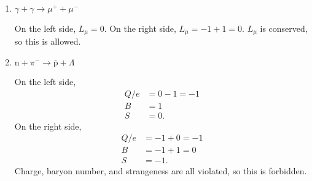 \documentclass[11pt]{article}
\begin{document}
\begin{enumerate}[label=\textbf{\arabic*.}]
{\begin{enumerate}[label=\textbf{(\alph*)}]
{\begin{enumerate}[label=\textbf{(\roman*)}]
{                            \begin{align*}
                                Q/e&=\frac{2}{3}-\frac{2}{3}=0 \\
                                B&=\frac{1}{3}-\frac{1}{3}=0 \\
                                S&=0.
                            \end{align*}
                            On the right side,
                            \begin{align*}
                                Q/e&=\frac{1}{3}-\frac{1}{3}=0 \\
                                B&=-\frac{1}{3}+\frac{1}{3}=0 \\
                                S&=1-1=0.
                            \end{align*}
                            Charge, baryon number, and strangeness are all conserved, so this is allowed.
                        }
                        \item{
                            \textbf{\boldmath \(\gamma+\gamma\rightarrow\mu^++\mu^-\)}
                            \par
                            On the left side, \(L_\mu=0\). On the right side, \(L_\mu=-1+1=0\). \(L_\mu\) is conserved, so this is allowed.
                        }
                        \item{
                            \textbf{\boldmath \(\mathrm{n}+\pi^-\rightarrow\bar{\mathrm{p}}+\Lambda\)}
                            \par
                            On the left side,
                            \begin{align*}
                                Q/e&=0-1=-1 \\
                                B&=1 \\
                                S&=0.
                            \end{align*}
                            On the right side,
                            \begin{align*}
                                Q/e&=-1+0=-1 \\
                                B&=-1+1=0 \\
                                S&=-1.
                            \end{align*}
                            Charge, baryon number, and strangeness are all violated, so this is forbidden.
                        }

\end{enumerate}}
\end{enumerate}}
\end{enumerate}
\end{document}
